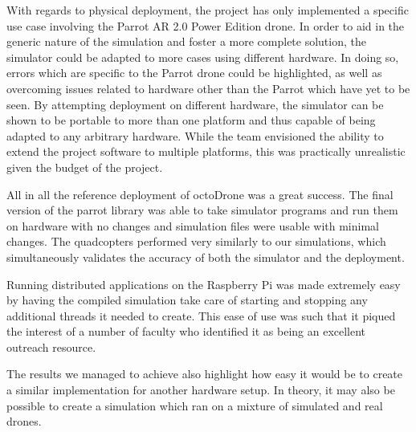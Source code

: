 With regards to physical deployment, the project has only implemented a specific use case involving the Parrot AR 2.0 Power Edition drone. In order to aid in the generic nature of the simulation and foster a more complete solution, the simulator could be adapted to more cases using different hardware. In doing so, errors which are specific to the Parrot drone could be highlighted, as well as overcoming issues related to hardware other than the Parrot which have yet to be seen. By attempting deployment on different hardware, the simulator can be shown to be portable to more than one platform and thus capable of being adapted to any arbitrary hardware. While the team envisioned the ability to extend the project software to multiple platforms, this was practically unrealistic given the budget of the project. 

All in all the reference deployment of octoDrone was a great success. The final version of the parrot library was able to take simulator programs and run them on hardware with no changes and simulation files were usable with minimal changes. The quadcopters performed very similarly to our simulations, which simultaneously validates the accuracy of both the simulator and the deployment.

Running distributed applications on the Raspberry Pi was made extremely easy by having the compiled simulation take care of starting and stopping any additional threads it needed to create. This ease of use was such that it piqued the interest of a number of faculty who identified it as being an excellent outreach resource.

The results we managed to achieve also highlight how easy it would be to create a similar implementation for another hardware setup. In theory, it may also be possible to create a simulation which ran on a mixture of simulated and real drones. 